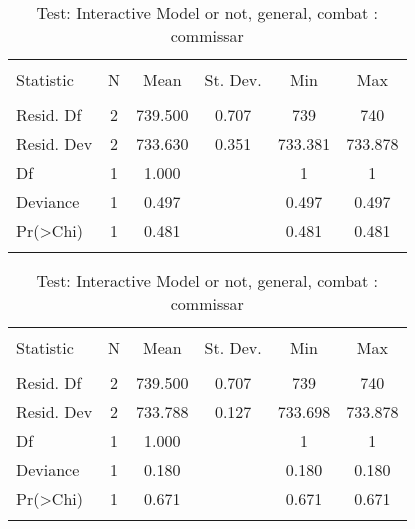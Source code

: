 \documentclass[12pt,letterpaper]{article}
\begin{document}
\begin{table}[!htbp] \centering 
	\caption{Test: Interactive Model or not, general, combat : commissar} 
	\label{} 
	\begin{tabular}{@{\extracolsep{5pt}}lccccc} 
		\\[-1.8ex]\hline 
		\hline \\[-1.8ex] 
		Statistic & \multicolumn{1}{c}{N} & \multicolumn{1}{c}{Mean} & \multicolumn{1}{c}{St. Dev.} & \multicolumn{1}{c}{Min} & \multicolumn{1}{c}{Max} \\ 
		\hline \\[-1.8ex] 
		Resid. Df & 2 & 739.500 & 0.707 & 739 & 740 \\ 
		Resid. Dev & 2 & 733.630 & 0.351 & 733.381 & 733.878 \\ 
		Df & 1 & 1.000 &  & 1 & 1 \\ 
		Deviance & 1 & 0.497 &  & 0.497 & 0.497 \\ 
		Pr(\textgreater Chi) & 1 & 0.481 &  & 0.481 & 0.481 \\ 
		\hline \\[-1.8ex] 
	\end{tabular} 
\end{table} 


\begin{table}[!htbp] \centering 
	\caption{Test: Interactive Model or not, general, combat : commissar} 
	\label{} 
	\begin{tabular}{@{\extracolsep{5pt}}lccccc} 
		\\[-1.8ex]\hline 
		\hline \\[-1.8ex] 
		Statistic & \multicolumn{1}{c}{N} & \multicolumn{1}{c}{Mean} & \multicolumn{1}{c}{St. Dev.} & \multicolumn{1}{c}{Min} & \multicolumn{1}{c}{Max} \\ 
		\hline \\[-1.8ex] 
		Resid. Df & 2 & 739.500 & 0.707 & 739 & 740 \\ 
		Resid. Dev & 2 & 733.788 & 0.127 & 733.698 & 733.878 \\ 
		Df & 1 & 1.000 &  & 1 & 1 \\ 
		Deviance & 1 & 0.180 &  & 0.180 & 0.180 \\ 
		Pr(\textgreater Chi) & 1 & 0.671 &  & 0.671 & 0.671 \\ 
		\hline \\[-1.8ex] 
	\end{tabular} 
\end{table} 
\end{document}
